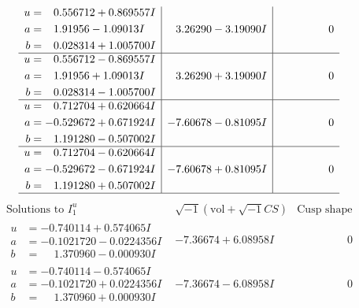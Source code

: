 \documentclass[1p]{elsarticle_modified}
\theoremstyle{definition}
\newcommand{\I}{\sqrt{-1}}
\begin{document}
$$\begin{array}{c|c|c}
\begin{aligned}
u &= \phantom{-}0.556712 + 0.869557 I \\
a &= \phantom{-}1.91956 - 1.09013 I \\
b &= \phantom{-}0.028314 + 1.005700 I\end{aligned}
 & \phantom{-}3.26290 - 3.19090 I & \phantom{-0.000000 } 0 \\ \hline\begin{aligned}
u &= \phantom{-}0.556712 - 0.869557 I \\
a &= \phantom{-}1.91956 + 1.09013 I \\
b &= \phantom{-}0.028314 - 1.005700 I\end{aligned}
 & \phantom{-}3.26290 + 3.19090 I & \phantom{-0.000000 } 0 \\ \hline\begin{aligned}
u &= \phantom{-}0.712704 + 0.620664 I \\
a &= -0.529672 + 0.671924 I \\
b &= \phantom{-}1.191280 - 0.507002 I\end{aligned}
 & -7.60678 - 0.81095 I & \phantom{-0.000000 } 0 \\ \hline\begin{aligned}
u &= \phantom{-}0.712704 - 0.620664 I \\
a &= -0.529672 - 0.671924 I \\
b &= \phantom{-}1.191280 + 0.507002 I\end{aligned}
 & -7.60678 + 0.81095 I & \phantom{-0.000000 } 0\\
 \hline 
 \end{array}$$\newpage$$\begin{array}{c|c|c}  
\text{Solutions to }I^u_{1}& \I (\text{vol} + \sqrt{-1}CS) & \text{Cusp shape}\\
 \hline 
\begin{aligned}
u &= -0.740114 + 0.574065 I \\
a &= -0.1021720 - 0.0224356 I \\
b &= \phantom{-}1.370960 - 0.000930 I\end{aligned}
 & -7.36674 + 6.08958 I & \phantom{-0.000000 } 0 \\ \hline\begin{aligned}
u &= -0.740114 - 0.574065 I \\
a &= -0.1021720 + 0.0224356 I \\
b &= \phantom{-}1.370960 + 0.000930 I\end{aligned}
 & -7.36674 - 6.08958 I & \phantom{-0.000000 } 0 \\ \hline\begin{aligned}

\end{aligned}
\end{array}$$
\end{document}
